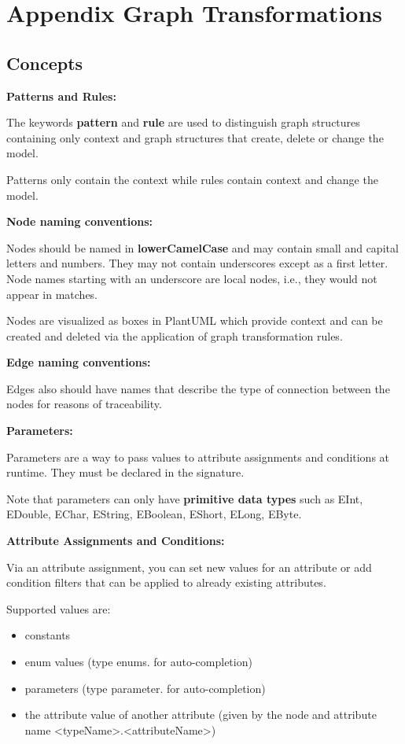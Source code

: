 \section{Appendix Graph Transformations}

\subsection{Concepts}

\textbf{Patterns and Rules:}

The keywords \textbf{pattern} and \textbf{rule} are used to distinguish graph structures containing only context and graph structures that create, delete or change the model.

Patterns only contain the context while rules contain context and change the model.\newline

\textbf{Node naming conventions:}

Nodes should be named in \textbf{lowerCamelCase} and may contain small and capital letters and numbers. They may not contain underscores except as a first letter. Node names starting with an underscore are local nodes, i.e., they would not appear in matches.

Nodes are visualized as boxes in PlantUML which provide context and can be created and deleted via the application of graph transformation rules.\newline

\textbf{Edge naming conventions:}

Edges also should have names that describe the type of connection between the nodes for reasons of traceability.\newline

\textbf{Parameters:}

Parameters are a way to pass values to attribute assignments and conditions at runtime. They must be declared in the signature.

Note that parameters can only have \textbf{primitive data types} such as EInt, EDouble, EChar, EString, EBoolean, EShort, ELong, EByte.\newline

\textbf{Attribute Assignments and Conditions:}

Via an attribute assignment, you can set new values for an attribute or add condition filters that can be applied to already existing attributes.

Supported values are:
\begin{itemize}

\item constants 
\item enum values (type enums. for auto-completion)
\item parameters (type parameter. for auto-completion)
\item the attribute value of another attribute \newline (given by the node and attribute name <typeName>.<attributeName>)

\end{itemize}

